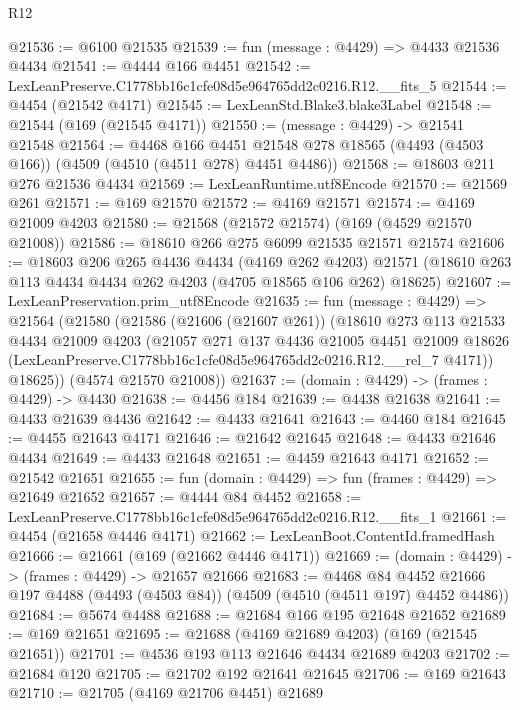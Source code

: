 \begin{lexlean}{R12}
\begin{coremodule}
@21536 := @6100 @21535
@21539 := fun (message : @4429) => @4433 @21536 @4434
@21541 := @4444 @166 @4451
@21542 := LexLeanPreserve.C1778bb16c1cfe08d5e964765dd2c0216.R12.__fits_5
@21544 := @4454 (@21542 @4171)
@21545 := LexLeanStd.Blake3.blake3Label
@21548 := @21544 (@169 (@21545 @4171))
@21550 := (message : @4429) -> @21541 @21548
@21564 := @4468
    @166
    @4451
    @21548
    @278
    @18565
    (@4493 (@4503 @166))
    (@4509 (@4510 (@4511 @278) @4451 @4486))
@21568 := @18603 @211 @276 @21536 @4434
@21569 := LexLeanRuntime.utf8Encode
@21570 := @21569 @261
@21571 := @169 @21570
@21572 := @4169 @21571
@21574 := @4169 @21009 @4203
@21580 := @21568 (@21572 @21574) (@169 (@4529 @21570 @21008))
@21586 := @18610 @266 @275 @6099 @21535 @21571 @21574
@21606 := @18603
    @206
    @265
    @4436
    @4434
    (@4169 @262 @4203)
    @21571
    (@18610 @263 @113 @4434 @4434 @262 @4203 (@4705 @18565 @106 @262) @18625)
@21607 := LexLeanPreservation.prim_utf8Encode
@21635 := fun (message : @4429) =>
  @21564
    (@21580
      (@21586
        (@21606 (@21607 @261))
        (@18610
          @273
          @113
          @21533
          @4434
          @21009
          @4203
          (@21057
            @271
            @137
            @4436
            @21005
            @4451
            @21009
            @18626
            (LexLeanPreserve.C1778bb16c1cfe08d5e964765dd2c0216.R12.__rel_7 @4171))
          @18625))
      (@4574 @21570 @21008))
@21637 := (domain : @4429) -> (frames : @4429) -> @4430
@21638 := @4456 @184
@21639 := @4438 @21638
@21641 := @4433 @21639 @4436
@21642 := @4433 @21641
@21643 := @4460 @184
@21645 := @4455 @21643 @4171
@21646 := @21642 @21645
@21648 := @4433 @21646 @4434
@21649 := @4433 @21648
@21651 := @4459 @21643 @4171
@21652 := @21542 @21651
@21655 := fun (domain : @4429) => fun (frames : @4429) => @21649 @21652
@21657 := @4444 @84 @4452
@21658 := LexLeanPreserve.C1778bb16c1cfe08d5e964765dd2c0216.R12.__fits_1
@21661 := @4454 (@21658 @4446 @4171)
@21662 := LexLeanBoot.ContentId.framedHash
@21666 := @21661 (@169 (@21662 @4446 @4171))
@21669 := (domain : @4429) -> (frames : @4429) -> @21657 @21666
@21683 := @4468
    @84
    @4452
    @21666
    @197
    @4488
    (@4493 (@4503 @84))
    (@4509 (@4510 (@4511 @197) @4452 @4486))
@21684 := @5674 @4488
@21688 := @21684 @166 @195 @21648 @21652
@21689 := @169 @21651
@21695 := @21688 (@4169 @21689 @4203) (@169 (@21545 @21651))
@21701 := @4536 @193 @113 @21646 @4434 @21689 @4203
@21702 := @21684 @120
@21705 := @21702 @192 @21641 @21645
@21706 := @169 @21643
@21710 := @21705 (@4169 @21706 @4451) @21689

\end{coremodule}
\end{lexlean}
